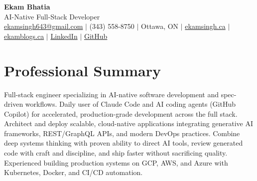 \documentclass[11pt,a4paper]{article}
\begin{document}
\begin{center}
    {\LARGE \textbf{Ekam Bhatia}} \\
    \vspace{2pt}
    {\normalsize AI-Native Full-Stack Developer } \\
    \vspace{4pt}
    \small
    \href{mailto:ekamsingh643@gmail.com}{ekamsingh643@gmail.com} $|$
    (343) 558-8750 $|$ Ottawa, ON $|$
    \href{https://www.ekamsingh.ca}{ekamsingh.ca} $|$
    \href{https://www.ekamblogs.ca}{ekamblogs.ca} $|$
    \href{https://www.linkedin.com/in/ekam-bhatia-335840168}{LinkedIn} $|$
    \href{https://github.com/bhat0155}{GitHub}
\end{center}

\section{Professional Summary}
Full-stack engineer specializing in AI-native software development and spec-driven workflows. Daily user of Claude Code and AI coding agents (GitHub Copilot) for accelerated, production-grade development across the full stack. Architect and deploy scalable, cloud-native applications integrating generative AI frameworks, REST/GraphQL APIs, and modern DevOps practices. Combine deep systems thinking with proven ability to direct AI tools, review generated code with craft and discipline, and ship faster without sacrificing quality. Experienced building production systems on GCP, AWS, and Azure with Kubernetes, Docker, and CI/CD automation.

\end{document}
